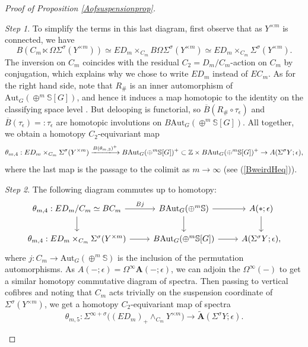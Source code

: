 \documentclass[a4paper, oneside]{amsart}
\newcommand{\1}{\mathds{1}}
\theoremstyle{remark}
\newtheorem{step}{Step}
\theoremstyle{definition}
\newcommand{\Z}{{\scaleobj{0.97}{\mathbb{Z}}}}
\newcommand{\s}{\mathbb{S}}
\newcommand{\Asp}{\mathbf{A}}
\numberwithin{equation}{section}
\begin{document}
\begin{proof}[Proof of Proposition \ref{Aofsuspensionprop}]
\begin{step}
To simplify the terms in this last diagram, first observe that as $Y^{\times m}$ is connected, we have
$$
B(C_m\ltimes\Omega\Sigma^{\sigma}(Y^{\times m}))\simeq ED_m\times_{C_m}B\Omega\Sigma^{\sigma}(Y^{\times m})\simeq ED_m\times_{C_m}\Sigma^{\sigma}(Y^{\times m}).
$$
The inversion on $C_m$ coincides with the residual $C_2=D_m/C_m$-action on $C_m$ by conjugation, which explains why we chose to write $ED_m$ instead of $EC_m$. As for the right hand side, note that $R_\#$ is an inner automorphism of $\mathrm{Aut}_G(\oplus^m \s[G])$, and hence it induces a map homotopic to the identity on the classifying space level \cite[\S II, Thm. 1.9]{Adem2004}. But delooping is functorial, so $\overline{B}(R_\#\circ\tau_\epsilon)$ and $\overline{B}(\tau_\epsilon)=:\tau_{\epsilon}$ are homotopic involutions on $B\mathrm{Aut}_G(\oplus^m \s[G])$. All together, we obtain a homotopy $C_2$-equivariant map
$$
\theta_{m,4}: ED_m\times_{C_m} \Sigma^\sigma (Y^{\times m}) \xlongrightarrow{B(\theta_{m,3})^+} B\mathrm{Aut}_G(\oplus^m \s[G])^+\subset \Z\times B\mathrm{Aut}_G(\oplus^m \s[G])^+\to A(\Sigma^\sigma Y;\epsilon),
    $$
where the last map is the passage to the colimit as $m\to \infty$ (see (\ref{BweirdHeq})).
\end{step}



\begin{step}
The following diagram commutes up to homotopy:
    $$
    \begin{tikzcd}
        \theta_{m,4}:ED_m/C_m\simeq BC_m\rar["Bj"]\dar &B\mathrm{Aut}_G(\oplus^m\s)\rar\dar & A(*;\epsilon)\dar\\
        \theta_{m,4}:ED_m\times_{C_m}\Sigma^\sigma(Y^{\times m})\rar & B\mathrm{Aut}_G(\oplus^m\s[G])\rar & A(\Sigma^\sigma Y;\epsilon),
    \end{tikzcd}
    $$
    where $j: C_m\to \mathrm{Aut}_G(\oplus^m\s)$ is the inclusion of the permutation automorphisms. As $A(-;\epsilon)=\Omega^\infty\Asp(-;\epsilon)$, we can adjoin the $\Omega^\infty(-)$ to get a similar homotopy commutative diagram of spectra. Then passing to vertical cofibres and noting that $C_m$ acts trivially on the suspension coordinate of $\Sigma^\sigma(Y^{\times m})$, we get a homotopy $C_2$-equivariant map of spectra
    $$
\theta_{m,5}: \Sigma^{\infty+\sigma}\big((ED_m)_+\wedge_{C_m} Y^{\times m}\big)\longrightarrow \widetilde{\Asp}(\Sigma^\sigma Y;\epsilon).
    $$
\end{step}



\end{proof}
\end{document}
